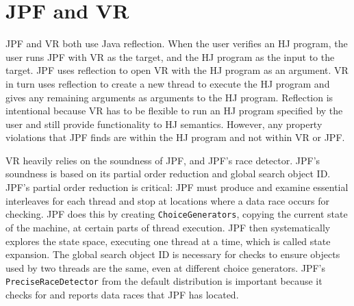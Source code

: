 \section{JPF and VR}

JPF and VR both use Java reflection. When the user verifies an HJ program, the user runs JPF with VR as the target, and the HJ program as the input to the target. JPF uses reflection to open VR with the HJ program as an argument. VR in turn uses reflection to create a new thread to execute the HJ program and gives any remaining arguments as arguments to the HJ program. Reflection is intentional because VR has to be flexible to run an HJ program specified by the user and still provide functionality to HJ semantics. However, any property violations that JPF finds are within the HJ program and not within VR or JPF.

\begin{comment}
\begin{figure}
\begin{center}
{\small
\begin{verbatim}
public static void main (String args[]) {
   Class<?> verifyClass = 
      Class.forName((args[0])+"$Main");
   Class<?> stringArrayClass = args.getClass();
   Constructor<?> constructor = 
      verifyClass.getConstructor(stringArrayClass);
   String[] newArgs = new String[args.length -1];
   for (int i = 0; i < args.length-1; i++)
      newArgs[i] = args[i+1];
   java.lang.Object object = 
      constructor.newInstance(
         (java.lang.Object) newArgs);
   Class<?> thread = Class.forName("java.lang.Thread");
   Method method = thread.getDeclaredMethod("start");
   method.invoke(object, (java.lang.Object[]) null);}
\end{verbatim}
}
\end{center}
\caption{A simplified version of the main method in VR.}
\label{fig:main}
\end{figure}
\end{comment}

VR heavily relies on the soundness of JPF, and JPF's race detector. JPF's soundness is based on its partial order reduction and global search object ID. JPF's partial order reduction is critical: JPF must produce and examine essential interleaves for each thread and stop at locations where a data race occurs for checking. JPF does this by creating \texttt{ChoiceGenerators}, copying the current state of the machine, at certain parts of thread execution. JPF then systematically explores the state space, executing one thread at a time, which is called state expansion. The global search object ID is necessary for checks to ensure objects used by two threads are the same, even at different choice generators. JPF's \texttt{PreciseRaceDetector} from the default distribution is important because it checks for and reports data races that JPF has located.

